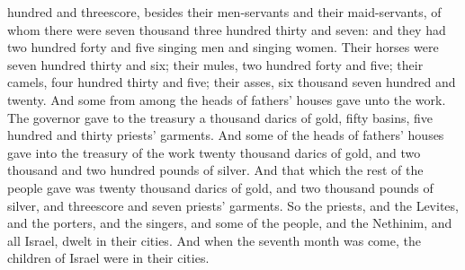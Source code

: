 hundred and threescore, besides their men-servants and their maid-servants, of whom there were seven thousand three hundred thirty and seven: and they had two hundred forty and five singing men and singing women. Their horses were seven hundred thirty and six; their mules, two hundred forty and five; their camels, four hundred thirty and five; their asses, six thousand seven hundred and twenty.  And some from among the heads of fathers’ houses gave unto the work. The governor gave to the treasury a thousand darics of gold, fifty basins, five hundred and thirty priests’ garments. And some of the heads of fathers’ houses gave into the treasury of the work twenty thousand darics of gold, and two thousand and two hundred pounds of silver. And that which the rest of the people gave was twenty thousand darics of gold, and two thousand pounds of silver, and threescore and seven priests’ garments.  So the priests, and the Levites, and the porters, and the singers, and some of the people, and the Nethinim, and all Israel, dwelt in their cities. And when the seventh month was come, the children of Israel were in their cities. 

